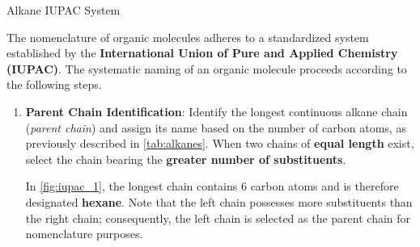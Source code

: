 \documentclass[10pt]{article}
\begin{document}
      \begin{core}[label=core:alkane_iupac]{Alkane IUPAC System}

        The nomenclature of organic molecules adheres to a standardized system established by the \textbf{International Union of Pure and Applied Chemistry (IUPAC)}. The systematic naming of an organic molecule proceeds according to the following steps.

        \begin{enumerate}[label=(\arabic*)]

          \item \textbf{Parent Chain Identification}: Identify the longest continuous alkane chain (\textit{parent chain}) and assign its name based on the number of carbon atoms, as previously described in \autoref{tab:alkanes}. When two chains of \textbf{equal length} exist, select the chain bearing the \textbf{greater number of substituents}.


          In \autoref{fig:iupac_1}, the longest chain contains 6 carbon atoms and is therefore designated \textbf{hexane}. Note that the left chain possesses more substituents than the right chain; consequently, the left chain is selected as the parent chain for nomenclature purposes.


\end{enumerate}
\end{core}
\end{document}
